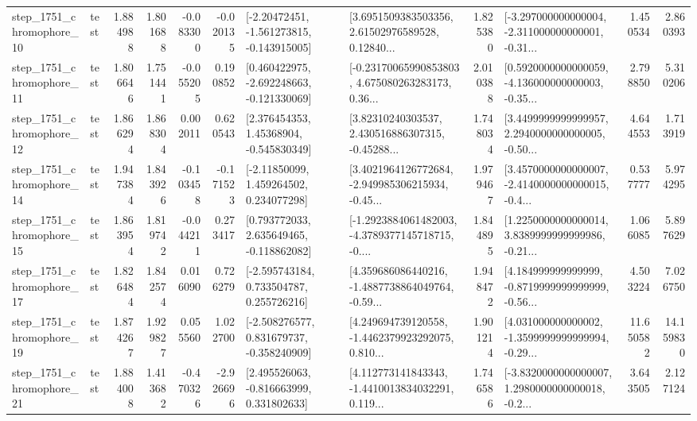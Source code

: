 \begin{tabular}{llrrrrllrlrr}
 step\_1751\_chromophore\_10 &      test &      1.884988 &    1.801688 &     -0.083300 & -0.020135 &   [-2.20472451, -1.561273815, -0.143915005] &  [3.6951509383503356, 2.61502976589528, 0.12840... &       1.825380 &  [-3.297000000000004, -2.311000000000001, -0.31... &            1.450534 &          2.860393 \\
 step\_1751\_chromophore\_11 &      test &      1.806646 &    1.751441 &     -0.055205 &  0.190852 &   [0.460422975, -2.692248663, -0.121330069] &  [-0.23170065990853803, 4.675080263283173, 0.36... &       2.010388 &  [0.5920000000000059, -4.136000000000003, -0.35... &            2.798850 &          5.310206 \\
 step\_1751\_chromophore\_12 &      test &      1.866294 &    1.868304 &      0.002011 &  0.620543 &     [2.376454353, 1.45368904, -0.545830349] &  [3.82310240303537, 2.430516886307315, -0.45288... &       1.748034 &  [3.4499999999999957, 2.2940000000000005, -0.50... &            4.644553 &          1.713919 \\
 step\_1751\_chromophore\_14 &      test &      1.947384 &    1.843926 &     -0.103458 & -0.171523 &     [-2.11850099, 1.459264502, 0.234077298] &  [3.4021964126772684, -2.949985306215934, -0.45... &       1.979467 &  [3.4570000000000007, -2.4140000000000015, -0.4... &            0.537777 &          5.974295 \\
 step\_1751\_chromophore\_15 &      test &      1.863954 &    1.819742 &     -0.044211 &  0.273417 &    [0.793772033, 2.635649465, -0.118862082] &  [-1.2923884061482003, -4.3789377145718715, -0.... &       1.844895 &  [1.2250000000000014, 3.8389999999999986, -0.21... &            1.066085 &          5.897629 \\
 step\_1751\_chromophore\_17 &      test &      1.826484 &    1.842574 &      0.016090 &  0.726279 &    [-2.595743184, 0.733504787, 0.255726216] &  [4.359686086440216, -1.4887738864049764, -0.59... &       1.948472 &  [4.184999999999999, -0.8719999999999999, -0.56... &            4.503224 &          7.026750 \\
 step\_1751\_chromophore\_19 &      test &      1.874267 &    1.929827 &      0.055560 &  1.022700 &   [-2.508276577, 0.831679737, -0.358240909] &  [4.249694739120558, -1.4462379923292075, 0.810... &       1.901214 &  [4.031000000000002, -1.3599999999999994, -0.29... &           11.650582 &         14.159830 \\
 step\_1751\_chromophore\_21 &      test &      1.884008 &    1.413682 &     -0.470326 & -2.926696 &    [2.495526063, -0.816663999, 0.331802633] &  [4.112773141843343, -1.4410013834032291, 0.119... &       1.746586 &  [-3.8320000000000007, 1.2980000000000018, -0.2... &            3.643505 &          2.127124 \\

\end{tabular}
